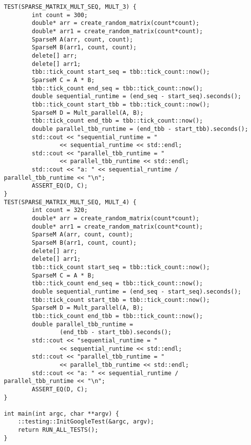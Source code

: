 \documentclass{report}
\begin{document}
\begin{lstlisting}
TEST(SPARSE_MATRIX_MULT_SEQ, MULT_3) {
        int count = 300;
        double* arr = create_random_matrix(count*count);
        double* arr1 = create_random_matrix(count*count);
        SparseM A(arr, count, count);
        SparseM B(arr1, count, count);
        delete[] arr;
        delete[] arr1;
        tbb::tick_count start_seq = tbb::tick_count::now();
        SparseM C = A * B;
        tbb::tick_count end_seq = tbb::tick_count::now();
        double sequential_runtime = (end_seq - start_seq).seconds();
        tbb::tick_count start_tbb = tbb::tick_count::now();
        SparseM D = Mult_parallel(A, B);
        tbb::tick_count end_tbb = tbb::tick_count::now();
        double parallel_tbb_runtime = (end_tbb - start_tbb).seconds();
        std::cout << "sequential_runtime = "
                << sequential_runtime << std::endl;
        std::cout << "parallel_tbb_runtime = "
                << parallel_tbb_runtime << std::endl;
        std::cout << "a: " << sequential_runtime / parallel_tbb_runtime << "\n";
        ASSERT_EQ(D, C);
}
TEST(SPARSE_MATRIX_MULT_SEQ, MULT_4) {
        int count = 320;
        double* arr = create_random_matrix(count*count);
        double* arr1 = create_random_matrix(count*count);
        SparseM A(arr, count, count);
        SparseM B(arr1, count, count);
        delete[] arr;
        delete[] arr1;
        tbb::tick_count start_seq = tbb::tick_count::now();
        SparseM C = A * B;
        tbb::tick_count end_seq = tbb::tick_count::now();
        double sequential_runtime = (end_seq - start_seq).seconds();
        tbb::tick_count start_tbb = tbb::tick_count::now();
        SparseM D = Mult_parallel(A, B);
        tbb::tick_count end_tbb = tbb::tick_count::now();
        double parallel_tbb_runtime =
                (end_tbb - start_tbb).seconds();
        std::cout << "sequential_runtime = "
                << sequential_runtime << std::endl;
        std::cout << "parallel_tbb_runtime = "
                << parallel_tbb_runtime << std::endl;
        std::cout << "a: " << sequential_runtime / parallel_tbb_runtime << "\n";
        ASSERT_EQ(D, C);
}

int main(int argc, char **argv) {
    ::testing::InitGoogleTest(&argc, argv);
    return RUN_ALL_TESTS();
}
\end{lstlisting}
\end{document}
